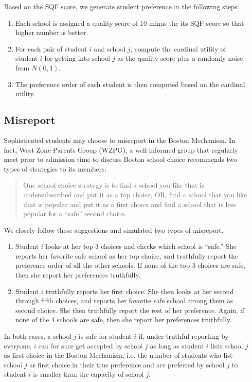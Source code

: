 \documentclass{article}
\begin{document}
Based on the SQF score, we generate student preference in the following steps:
\begin{enumerate}
  \item Each school is assigned a quality score of 10 minus the its SQF score so that higher number is better. 
  \item For each pair of student $i$ and school $j$, compute the cardinal utility of student $i$ for getting into school $j$ as the quality score plus a randomly noise from $N(0,1)$. 
  \item The preference order of each student is then computed based on the cardinal utility. 
\end{enumerate}

\subsection{Misreport}

Sophisticated students may choose to misreport in the Boston Mechanism. In fact, West Zone Parents Group (WZPG), a well-informed group that regularly meet prior to admission time to discuss Boston school choice recommends two types of strategies to its members:
\begin{quote}
One school choice strategy is to find a school you like that is undersubscribed and put it as a top choice, OR, find a school that you like that is popular and put it as a first choice and find a school that is less popular for a “safe” second choice.    
\end{quote}

We closely follow these suggestions and simulated two types of misreport. 
\begin{enumerate}
  \item Student $i$ looks at her top 3 choices and checks which school is ``safe.'' She reports her favorite safe school as her top choice, and truthfully report the preference order of all the other schools. If none of the top 3 choices are safe, then she report her preferences truthfully. 
  \item Student $i$ truthfully reports her first choice. She then looks at her second through fifth choices, and reports her favorite safe school among them as second choice. She then truthfully report the rest of her preference. Again, if none of the 4 schools are safe, then she report her preferences truthfully. 
\end{enumerate}
In both cases, a school $j$ is safe for student $i$ if, under truthful reporting by everyone, $i$ can for sure get accepted by school $j$ as long as student $i$ lists school $j$ as first choice in the Boston Mechanism, i.e. the number of students who list school $j$ as first choice in their true preference and are preferred by school $j$ to student $i$ is smaller than the capacity of school $j$.
\end{document}
